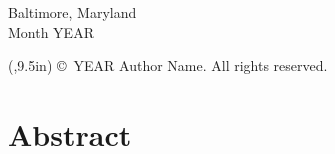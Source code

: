 \vspace{0.75in}                     %
\begin{center}
    Baltimore, Maryland \\          %
    Month YEAR                      %
    
    {\begin{textblock*}{\textwidth}(\GlobalMargin,9.5in)
        \copyright\ YEAR Author Name. All rights reserved.
    \end{textblock*}
    \null}
\end{center}






\clearpage 
{}
\setcounter{page}{2}
\MainTextSpacing
{}
\section*{Abstract}

\blindtext



{
\clearpage
\TOCTextSpacing                         %
\hypersetup{linkcolor=black}            %
\renewcommand{\contentsname}{Table of Contents \vspace{3.5pt} \hrule}
\tableofcontents


\clearpage {}
{}
\renewcommand{\listtablename}{List of Tables \vspace{3.5pt} \hrule}
\listoftables


\clearpage {}
{}
\renewcommand{\listfigurename}{List of Figures \vspace{3.5pt} \hrule}
\listoffigures
}

